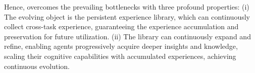 Hence, \method{} overcomes the prevailing bottlenecks with three profound properties: 
(i) The evolving object is the persistent experience library, which can continuously collect cross-task experience, guaranteeing the experience accumulation and preservation for future utilization.
(ii) The library can continuously expand and refine, enabling agents progressively acquire deeper insights and knowledge, scaling their cognitive capabilities with accumulated experiences, achieving continuous evolution.
